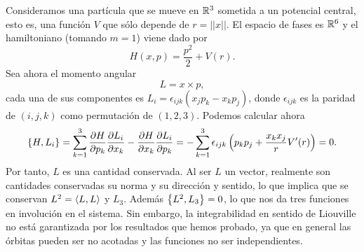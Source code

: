 \begin{ejemplo}
  Consideramos una partícula que se mueve en $\mathbb{R}^3$ sometida a un potencial central, esto es, una función $V$ que sólo depende de $r=||x||$. El espacio de fases es $\mathbb{R}^6$ y el hamiltoniano (tomando $m=1$) viene dado por
  \begin{equation*}
    H(x,p)=\frac{p^2}{2}+V(r).   
  \end{equation*}
  Sea ahora el momento angular
  \begin{equation*}
    L=x \times p,
  \end{equation*}
  cada una de sus componentes es $L_i=\epsilon_{ijk}(x_jp_k-x_kp_j)$, donde $\epsilon_{ijk}$ es la paridad de $(i,j,k)$ como permutación de $(1,2,3)$. Podemos calcular ahora 
  \begin{equation*}
    \left\lbrace H,L_i\right\rbrace= \sum_{k=1}^3 \frac{\partial H}{\partial p_k} \frac{\partial L_i}{\partial x_k} - \frac{\partial H}{\partial x_k} \frac{\partial L_i}{\partial p_k}= -\sum_{k=1}^3 \epsilon_{ijk}\left( p_kp_j + \frac{x_kx_j}{r}V'(r) \right)=0.
  \end{equation*}
  Por tanto, $L$ es una cantidad conservada. Al ser $L$ un vector, realmente son cantidades conservadas su norma y su dirección y sentido, lo que implica que se conservan $L^2=\left\langle L,L\right\rangle$ y $L_3$. Además $\left\lbrace L^2,L_3\right\rbrace=0$, lo que nos da tres funciones en involución en el sistema.
  Sin embargo, la integrabilidad en sentido de Liouville no está garantizada por los resultados que hemos probado, ya que en general las órbitas pueden ser no acotadas y las funciones no ser independientes. 
\end{ejemplo}
